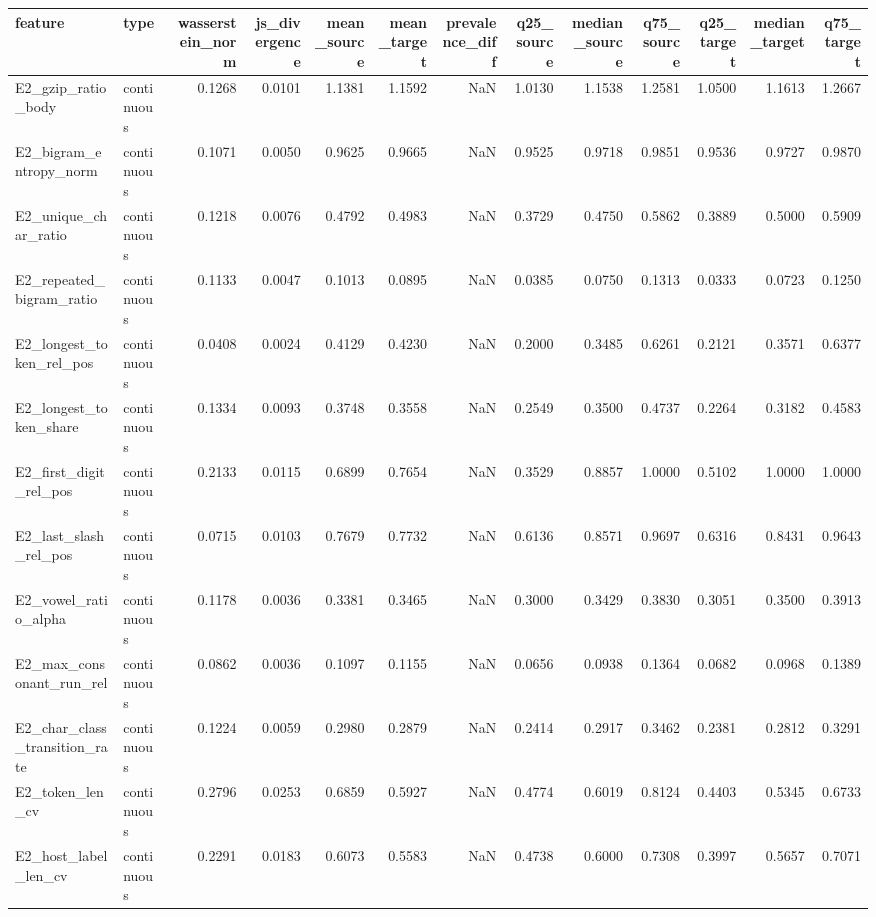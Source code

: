 \begin{tabular}{llrrrrrrrrrrr}
\toprule
feature & type & wasserstein\_norm & js\_divergence & mean\_source & mean\_target & prevalence\_diff & q25\_source & median\_source & q75\_source & q25\_target & median\_target & q75\_target \\
\midrule
E2\_gzip\_ratio\_body & continuous & 0.1268 & 0.0101 & 1.1381 & 1.1592 & NaN & 1.0130 & 1.1538 & 1.2581 & 1.0500 & 1.1613 & 1.2667 \\
E2\_bigram\_entropy\_norm & continuous & 0.1071 & 0.0050 & 0.9625 & 0.9665 & NaN & 0.9525 & 0.9718 & 0.9851 & 0.9536 & 0.9727 & 0.9870 \\
E2\_unique\_char\_ratio & continuous & 0.1218 & 0.0076 & 0.4792 & 0.4983 & NaN & 0.3729 & 0.4750 & 0.5862 & 0.3889 & 0.5000 & 0.5909 \\
E2\_repeated\_bigram\_ratio & continuous & 0.1133 & 0.0047 & 0.1013 & 0.0895 & NaN & 0.0385 & 0.0750 & 0.1313 & 0.0333 & 0.0723 & 0.1250 \\
E2\_longest\_token\_rel\_pos & continuous & 0.0408 & 0.0024 & 0.4129 & 0.4230 & NaN & 0.2000 & 0.3485 & 0.6261 & 0.2121 & 0.3571 & 0.6377 \\
E2\_longest\_token\_share & continuous & 0.1334 & 0.0093 & 0.3748 & 0.3558 & NaN & 0.2549 & 0.3500 & 0.4737 & 0.2264 & 0.3182 & 0.4583 \\
E2\_first\_digit\_rel\_pos & continuous & 0.2133 & 0.0115 & 0.6899 & 0.7654 & NaN & 0.3529 & 0.8857 & 1.0000 & 0.5102 & 1.0000 & 1.0000 \\
E2\_last\_slash\_rel\_pos & continuous & 0.0715 & 0.0103 & 0.7679 & 0.7732 & NaN & 0.6136 & 0.8571 & 0.9697 & 0.6316 & 0.8431 & 0.9643 \\
E2\_vowel\_ratio\_alpha & continuous & 0.1178 & 0.0036 & 0.3381 & 0.3465 & NaN & 0.3000 & 0.3429 & 0.3830 & 0.3051 & 0.3500 & 0.3913 \\
E2\_max\_consonant\_run\_rel & continuous & 0.0862 & 0.0036 & 0.1097 & 0.1155 & NaN & 0.0656 & 0.0938 & 0.1364 & 0.0682 & 0.0968 & 0.1389 \\
E2\_char\_class\_transition\_rate & continuous & 0.1224 & 0.0059 & 0.2980 & 0.2879 & NaN & 0.2414 & 0.2917 & 0.3462 & 0.2381 & 0.2812 & 0.3291 \\
E2\_token\_len\_cv & continuous & 0.2796 & 0.0253 & 0.6859 & 0.5927 & NaN & 0.4774 & 0.6019 & 0.8124 & 0.4403 & 0.5345 & 0.6733 \\
E2\_host\_label\_len\_cv & continuous & 0.2291 & 0.0183 & 0.6073 & 0.5583 & NaN & 0.4738 & 0.6000 & 0.7308 & 0.3997 & 0.5657 & 0.7071 \\

\end{tabular}
